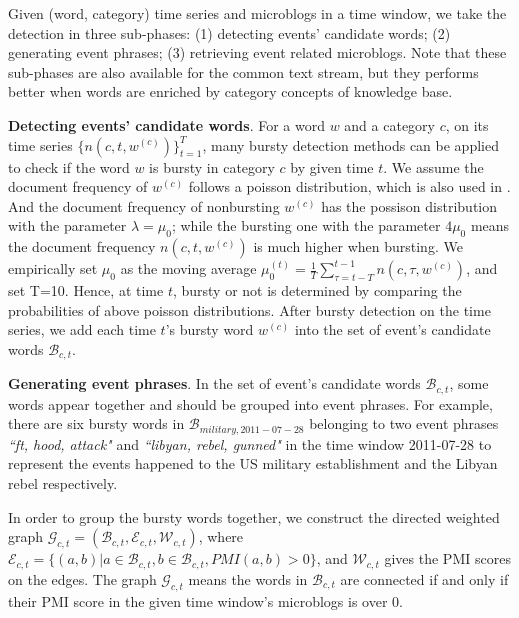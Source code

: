 \documentclass{article}
\begin{document}
Given (word, category) time series and microblogs in a time window, we take the detection in	 three sub-phases: (1) detecting events' candidate words; (2) generating event phrases; (3) retrieving event related microblogs.
Note that these sub-phases are also available for the common text stream, but they performs better when words are enriched by category concepts of knowledge base.

\textbf{Detecting events' candidate words}. For a word \(w\) and a category \(c\), on its time series \(\{n(c,t,w^{(c)})\}_{t=1}^{T}\), many bursty detection methods can be applied to check if the word \(w\) is bursty in category \(c\) by given time \(t\). 
We assume the document frequency of \(w^{(c)}\) follows a poisson distribution, which is also used in \cite{Diao:2012wj}.
And the document frequency of nonbursting \(w^{(c)}\) has the possison distribution with the parameter \(\lambda=\mu_0\); while the bursting one with the parameter \(4\mu_0\) means the document frequency \(n(c,t,w^{(c)})\) is much higher when bursting.
We empirically set \(\mu_0\) as the moving average \(\mu_0^{(t)}=\frac{1}{T}\sum_{\tau=t-T}^{t-1}n(c,\tau,w^{(c)})\), and set T=10.
Hence, at time \(t\), bursty or not is determined by comparing the probabilities of above poisson distributions. 
After bursty detection on the time series, we add each time \(t\)'s bursty word \(w^{(c)}\) into the set of event's candidate words \(\mathcal{B}_{c,t}\).

\textbf{Generating event phrases}. 
In the set of event's candidate words \(\mathcal{B}_{c,t}\), some words appear together and should be grouped into event phrases.
For example, there are six bursty words in \(\mathcal{B}_{military,2011-07-28}\) belonging to two event phrases \textit{``ft, hood, attack"} and \textit{``libyan, rebel, gunned"} in the time window 2011-07-28 to represent the events happened to the US military establishment and the Libyan rebel respectively. 

In order to group the bursty words together, we  construct the directed weighted graph \(\mathcal{G}_{c,t}=(\mathcal{B}_{c,t},\mathcal{E}_{c,t},\mathcal{W}_{c,t})\), where \(\mathcal{E}_{c,t}=\{(a,b)|a \in \mathcal{B}_{c,t}, b \in \mathcal{B}_{c,t}, PMI(a,b)>0 \}\), and \(\mathcal{W}_{c,t}\) gives the PMI scores on the edges.
The graph \(\mathcal{G}_{c,t}\) means the words in \(\mathcal{B}_{c,t}\) are connected if and only if their PMI score in the given time window's microblogs is over 0. 
\end{document}

